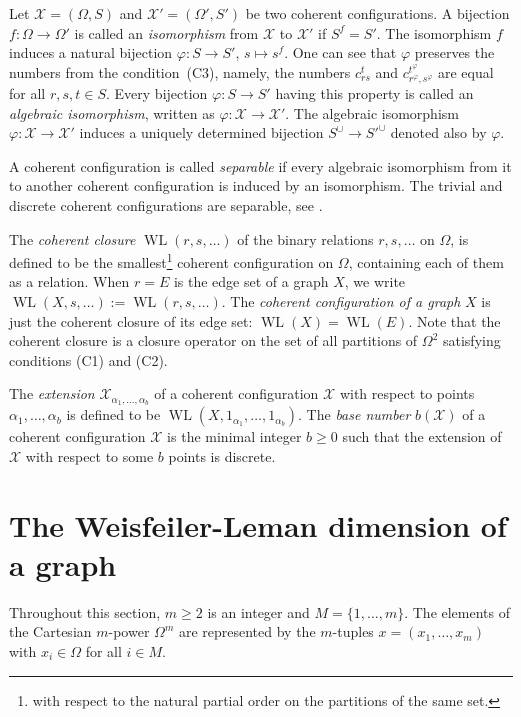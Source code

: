 \documentclass{amsart}
\newcommand{\cal}{\mathcal}
\def\cX{{\cal X}}
\DeclareMathOperator{\WL}{WL}
\begin{document}
Let $\cX=(\Omega,S)$ and $\cX'=(\Omega',S')$ be two coherent configurations. A bijection $f\colon\Omega\to\Omega'$ is called an {\it isomorphism} from $\cX$ to $\cX'$ if $S^f= S'$. The isomorphism $f$ induces a natural bijection $\varphi\colon S\to S'$, $s\mapsto s^f$. One can see that $\varphi$  preserves the numbers from the condition~(C3), namely, the numbers $c_{rs}^t$ and $c_{r^{\varphi},s^{\varphi}}^{t^{\varphi}}$ are equal  for all $r,s,t\in S$. Every bijection $\varphi\colon S\to S'$ having this property is called an {\it algebraic isomorphism}, written as $\varphi\colon \cX\to \cX'$. The algebraic isomorphism $\varphi\colon\cX\to\cX'$ induces a uniquely determined bijection $S^\cup\to {S'}^\cup$ denoted also by $\varphi$.

A coherent configuration is called {\it separable} if every algebraic isomorphism from it to another coherent configuration is induced by an isomorphism. The  trivial and discrete coherent configurations are separable, see \cite[Example~2.3.31]{CP2019}.


The {\it coherent closure} $\WL(r,s,\ldots)$ of the  binary relations $r,s,\ldots$ on $\Omega$, is defined to be the smallest\footnote{with respect to the natural	partial order on the partitions of the same set.} 
coherent configuration on $\Omega$, containing each of them as a relation. When $r=E$ is the edge set of a graph $X$, we write $\WL(X,s,\ldots):=\WL(r,s,\ldots)$.  The {\it coherent configuration of a graph} $X$ is just the coherent closure of its edge set: $\WL(X)=\WL(E)$. Note that the coherent closure  is a closure operator on the set of all partitions of $\Omega^2$ satisfying conditions (C1) and (C2).

The \emph{extension} $\cX_{\alpha_1,\ldots,\alpha_b}$ of a coherent configuration $\cX$ with respect to points $\alpha_1,\ldots,\alpha_b$ is defined to be $\WL(X,1_{\alpha_1},\ldots,1_{\alpha_b})$. The \emph{base number} $b(\cX)$ of a coherent configuration $\cX$ is 
the minimal integer $b\ge 0$ such that the extension of $\cX$ 
with respect to some $b$ points is discrete.




\section{The Weisfeiler-Leman dimension of a graph}\label{240623b}
Throughout this section, $m\ge 2$ is an integer and  $M=\{1,\ldots,m\}$.  The elements of the Cartesian $m$-power $\Omega^m$ are represented by the $m$-tuples $x=(x_1,\ldots,x_m)$ with $x_i\in\Omega$ for all $i\in M$.  
\end{document}
